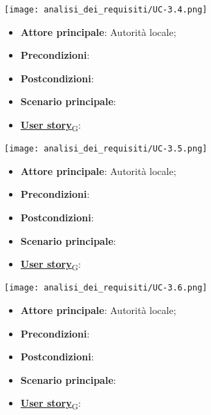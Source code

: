 \begin{center}
	\texttt{[image: analisi\_dei\_requisiti/UC-3.4.png]}
\end{center}
\begin{itemize}
	\item \textbf{Attore principale}: Autorità locale;
	\item \textbf{Precondizioni}:
	\item \textbf{Postcondizioni}:
	\item \textbf{Scenario principale}:
	\item \href{https://7last.github.io/docs/rtb/documentazione-interna/glossario\#user-story}{\textbf{User story}\textsubscript{G}}:
\end{itemize}

\begin{center}
	\texttt{[image: analisi\_dei\_requisiti/UC-3.5.png]}
\end{center}
\begin{itemize}
	\item \textbf{Attore principale}: Autorità locale;
	\item \textbf{Precondizioni}:
	\item \textbf{Postcondizioni}:
	\item \textbf{Scenario principale}:
	\item \href{https://7last.github.io/docs/rtb/documentazione-interna/glossario\#user-story}{\textbf{User story}\textsubscript{G}}:
\end{itemize}

\begin{center}
	\texttt{[image: analisi\_dei\_requisiti/UC-3.6.png]}
\end{center}
\begin{itemize}
	\item \textbf{Attore principale}: Autorità locale;
	\item \textbf{Precondizioni}:
	\item \textbf{Postcondizioni}:
	\item \textbf{Scenario principale}:
	\item \href{https://7last.github.io/docs/rtb/documentazione-interna/glossario\#user-story}{\textbf{User story}\textsubscript{G}}:
\end{itemize}

